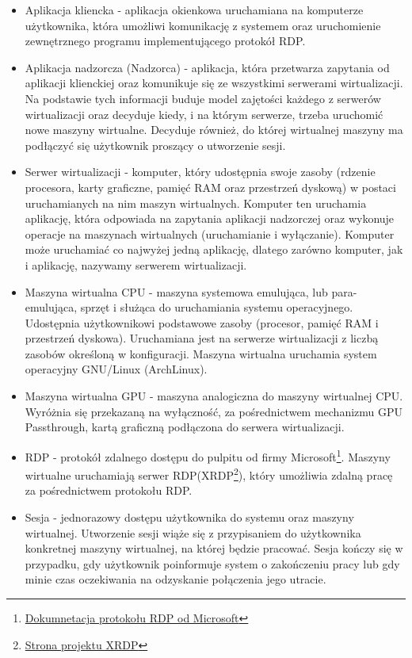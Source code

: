 \documentclass[../praca-dyplomowa.tex]{subfiles}
\begin{document}
\begin{itemize}
    \item Aplikacja kliencka - aplikacja okienkowa uruchamiana na komputerze użytkownika, która umożliwi komunikację z systemem oraz uruchomienie zewnętrznego programu implementującego protokół RDP.
    \item Aplikacja nadzorcza (Nadzorca) - aplikacja, która przetwarza zapytania od aplikacji klienckiej oraz komunikuje się ze wszystkimi serwerami wirtualizacji. Na podstawie tych informacji buduje model zajętości każdego z serwerów wirtualizacji oraz decyduje kiedy, i na którym serwerze, trzeba uruchomić nowe maszyny wirtualne. Decyduje również, do której wirtualnej maszyny ma podłączyć się użytkownik proszący o utworzenie sesji.
    \item Serwer wirtualizacji - komputer, który udostępnia swoje zasoby (rdzenie procesora, karty graficzne, pamięć RAM oraz przestrzeń dyskową) w postaci uruchamianych na nim maszyn wirtualnych. Komputer ten uruchamia aplikację, która odpowiada na zapytania aplikacji nadzorczej oraz wykonuje operacje na maszynach wirtualnych (uruchamianie i wyłączanie). Komputer może uruchamiać co najwyżej jedną aplikację, dlatego zarówno komputer, jak i aplikację, nazywamy serwerem wirtualizacji.
    \item Maszyna wirtualna CPU - maszyna systemowa emulująca, lub para-emulująca, sprzęt i służąca do uruchamiania systemu operacyjnego. Udostępnia użytkownikowi podstawowe zasoby (procesor, pamięć RAM i przestrzeń dyskowa). Uruchamiana jest na serwerze wirtualizacji z liczbą zasobów określoną w konfiguracji. Maszyna wirtualna uruchamia system operacyjny GNU/Linux (ArchLinux).
    \item Maszyna wirtualna GPU - maszyna analogiczna do maszyny wirtualnej CPU. Wyróżnia się przekazaną na wyłączność, za pośrednictwem mechanizmu GPU Passthrough, kartą graficzną podłączona do serwera wirtualizacji.
    \item RDP - protokół zdalnego dostępu do pulpitu od firmy Microsoft\footnote{\href{https://docs.microsoft.com/en-us/troubleshoot/windows-server/remote/understanding-remote-desktop-protocol}{Dokumnetacja protokołu RDP od Microsoft}}. Maszyny wirtualne uruchamiają serwer RDP(XRDP\footnote{\href{http://xrdp.org/}{Strona projektu XRDP}}), który umożliwia zdalną pracę za pośrednictwem protokołu RDP.
    \item Sesja - jednorazowy dostępu użytkownika do systemu oraz maszyny wirtualnej. Utworzenie sesji wiąże się z przypisaniem do użytkownika konkretnej maszyny wirtualnej, na której będzie pracować. Sesja kończy się w przypadku, gdy użytkownik poinformuje system o zakończeniu pracy lub gdy minie czas oczekiwania na odzyskanie połączenia jego utracie.

\end{itemize}
\end{document}
